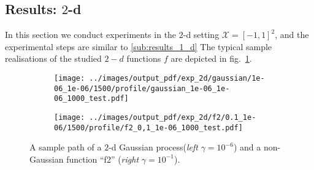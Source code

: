 \documentclass[conference]{IEEEtran}
\newcommand{\Xcal}{\mathcal{X}}
\begin{document}

\subsection{Results: $2$-d} %
\label{sub:results_2_d}

In this section we conduct experiments in the $2$-d setting $\Xcal=[-1,1]^2$, and
the experimental steps are similar to \ref{sub:results_1_d} The typical sample realisations
of the studied $2-d$ functions $f$ are depicted in fig.~\ref{fig:2d_profile}.
\begin{figure}%
  \centering
  \begin{subfigure}[b]{0.5\linewidth}
    \texttt{[image: ../images/output\_pdf/exp\_2d/gaussian/1e-06\_1e-06/1500/profile/gaussian\_1e-06\_1e-06\_1000\_test.pdf]}
  \end{subfigure}%
  \begin{subfigure}[b]{0.5\linewidth}
    \texttt{[image: ../images/output\_pdf/exp\_2d/f2/0.1\_1e-06/1500/profile/f2\_0,1\_1e-06\_1000\_test.pdf]}
  \end{subfigure}
  \caption{A sample path of a $2$-d Gaussian process(\textit{left} $\gamma=10^{-6}$)
  and a non-Gaussian function ``f2'' (\textit{right} $\gamma=10^{-1}$).}
  \label{fig:2d_profile}
\end{figure}
\end{document}
